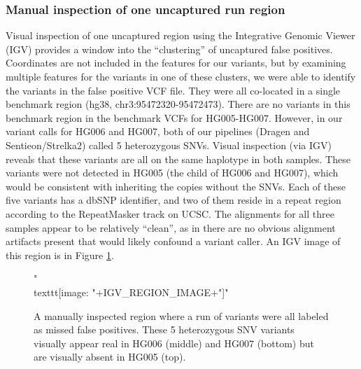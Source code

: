 \subsubsection{Manual inspection of one uncaptured run region}
Visual inspection of one uncaptured region using the Integrative Genomic Viewer (IGV) provides a window into the ``clustering'' of uncaptured false positives.
Coordinates are not included in the features for our variants, but by examining multiple features for the variants in one of these clusters, we were able to identify the variants in the false positive VCF file.
They were all co-located in a single benchmark region (hg38, chr3:95472320-95472473).
There are no variants in this benchmark region in the benchmark VCFs for HG005-HG007.
However, in our variant calls for HG006 and HG007, both of our pipelines (Dragen and Sentieon/Strelka2) called 5 heterozygous SNVs.
Visual inspection (via IGV) reveals that these variants are all on the same haplotype in both samples.
These variants were not detected in HG005 (the child of HG006 and HG007), which would be consistent with inheriting the copies without the SNVs.
Each of these five variants has a dbSNP identifier, and two of them reside in a repeat region according to the RepeatMasker track on UCSC.
The alignments for all three samples appear to be relatively ``clean'', as in there are no obvious alignment artifacts present that would likely confound a variant caller.
An IGV image of this region is in Figure \ref{fig:igv_region}.

\begin{figure}
    \centering
    {{ "\\texttt{[image: "+IGV\_REGION\_IMAGE+"]}" }} 
    \caption{A manually inspected region where a run of variants were all labeled as missed false positives.  These 5 heterozygous SNV variants visually appear real in HG006 (middle) and HG007 (bottom) but are visually absent in HG005 (top).}
    \label{fig:igv_region}
\end{figure}

